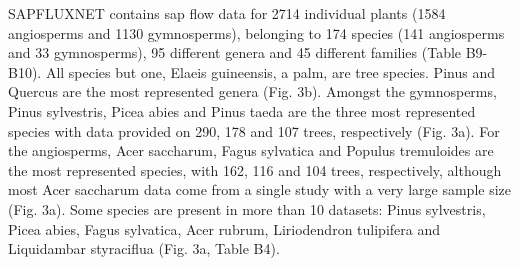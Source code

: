 \documentclass[11pt,twoside]{reedthesis}
\begin{document}
SAPFLUXNET contains sap flow data for 2714 individual plants (1584
angiosperms and 1130 gymnosperms), belonging to 174 species (141
angiosperms and 33 gymnosperms), 95 different genera and 45 different
families (Table B9-B10). All species but one, Elaeis guineensis, a palm,
are tree species. Pinus and Quercus are the most represented genera
(Fig. 3b). Amongst the gymnosperms, Pinus sylvestris, Picea abies and
Pinus taeda are the three most represented species with data provided on
290, 178 and 107 trees, respectively (Fig. 3a). For the angiosperms,
Acer saccharum, Fagus sylvatica and Populus tremuloides are the most
represented species, with 162, 116 and 104 trees, respectively, although
most Acer saccharum data come from a single study with a very large
sample size (Fig. 3a). Some species are present in more than 10
datasets: Pinus sylvestris, Picea abies, Fagus sylvatica, Acer rubrum,
Liriodendron tulipifera and Liquidambar styraciflua (Fig. 3a, Table
B4).\par
\end{document}
